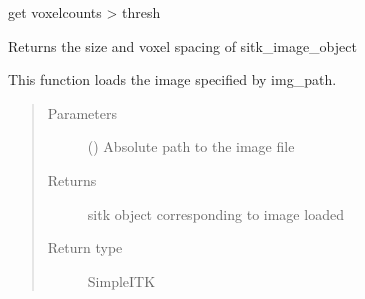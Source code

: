 \documentclass[letterpaper,10pt,english]{sphinxmanual}
\begin{document}

\begin{fulllineitems}
\label{\detokenize{index:utils.get_nonzero_voxel_count}}
get voxelcounts \textgreater{} thresh

\end{fulllineitems}


\begin{fulllineitems}
\label{\detokenize{index:utils.get_size_resolution}}
Returns the size and voxel spacing of sitk\_image\_object

\end{fulllineitems}


\begin{fulllineitems}
\label{\detokenize{index:utils.load_image}}
This function loads the image specified by img\_path.
\begin{quote}\begin{description}
\item[{Parameters}] \leavevmode
{} () \textendash{} Absolute path to the image file

\item[{Returns}] \leavevmode
sitk object corresponding to image loaded

\item[{Return type}] \leavevmode
SimpleITK

\end{description}\end{quote}

\end{fulllineitems}

\end{document}

